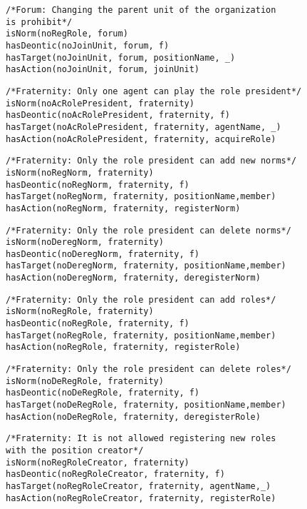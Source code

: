 \begin{verbatim}
/*Forum: Changing the parent unit of the organization 
is prohibit*/
isNorm(noRegRole, forum)
hasDeontic(noJoinUnit, forum, f)
hasTarget(noJoinUnit, forum, positionName, _)
hasAction(noJoinUnit, forum, joinUnit)
\end{verbatim}

\begin{verbatim}
/*Fraternity: Only one agent can play the role president*/
isNorm(noAcRolePresident, fraternity)
hasDeontic(noAcRolePresident, fraternity, f)
hasTarget(noAcRolePresident, fraternity, agentName, _)
hasAction(noAcRolePresident, fraternity, acquireRole)
\end{verbatim}

\begin{verbatim}
/*Fraternity: Only the role president can add new norms*/
isNorm(noRegNorm, fraternity)
hasDeontic(noRegNorm, fraternity, f)
hasTarget(noRegNorm, fraternity, positionName,member)
hasAction(noRegNorm, fraternity, registerNorm)
\end{verbatim}

\begin{verbatim}
/*Fraternity: Only the role president can delete norms*/
isNorm(noDeregNorm, fraternity)
hasDeontic(noDeregNorm, fraternity, f)
hasTarget(noDeregNorm, fraternity, positionName,member)
hasAction(noDeregNorm, fraternity, deregisterNorm)
\end{verbatim}

\begin{verbatim}
/*Fraternity: Only the role president can add roles*/
isNorm(noRegRole, fraternity)
hasDeontic(noRegRole, fraternity, f)
hasTarget(noRegRole, fraternity, positionName,member)
hasAction(noRegRole, fraternity, registerRole)
\end{verbatim}

\begin{verbatim}
/*Fraternity: Only the role president can delete roles*/
isNorm(noDeRegRole, fraternity)
hasDeontic(noDeRegRole, fraternity, f)
hasTarget(noDeRegRole, fraternity, positionName,member)
hasAction(noDeRegRole, fraternity, deregisterRole)
\end{verbatim}


\begin{verbatim}
/*Fraternity: It is not allowed registering new roles 
with the position creator*/
isNorm(noRegRoleCreator, fraternity)
hasDeontic(noRegRoleCreator, fraternity, f)
hasTarget(noRegRoleCreator, fraternity, agentName,_)
hasAction(noRegRoleCreator, fraternity, registerRole)
\end{verbatim}

